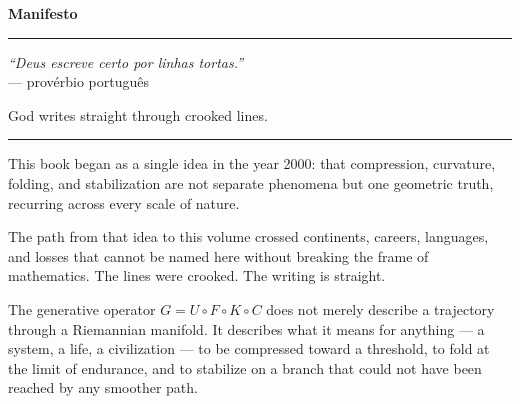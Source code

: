 \documentclass[12pt, oneside]{book}
\theoremstyle{plain}
\theoremstyle{definition}
\theoremstyle{remark}
\begin{document}
\cleardoublepage

\newpage
\thispagestyle{empty}
\vspace*{1.8cm}

\begin{center}
{\large\textbf{Manifesto}}
\end{center}

\vspace{0.5cm}

\begin{center}
\rule{0.5\textwidth}{0.4pt}
\end{center}

\vspace{0.5cm}

\begin{center}
{\large\textit{``Deus escreve certo por linhas tortas.''}}\\[0.4em]
{\small --- provérbio português}
\end{center}

\vspace{0.3cm}

\begin{center}
{\normalsize God writes straight through crooked lines.}
\end{center}

\vspace{0.5cm}

\begin{center}
\rule{0.4\textwidth}{0.2pt}
\end{center}

\vspace{0.5cm}

\noindent This book began as a single idea in the year 2000: that compression,
curvature, folding, and stabilization are not separate phenomena
but one geometric truth, recurring across every scale of nature.

\vspace{0.3cm}

\noindent The path from that idea to this volume crossed continents, careers,
languages, and losses that cannot be named here without breaking
the frame of mathematics. The lines were crooked. The writing is straight.

\vspace{0.3cm}

\noindent The generative operator $G = U \circ F \circ K \circ C$ does not merely
describe a trajectory through a Riemannian manifold. It describes
what it means for anything --- a system, a life, a civilization ---
to be compressed toward a threshold, to fold at the limit of
endurance, and to stabilize on a branch that could not have been
reached by any smoother path.
\end{document}
